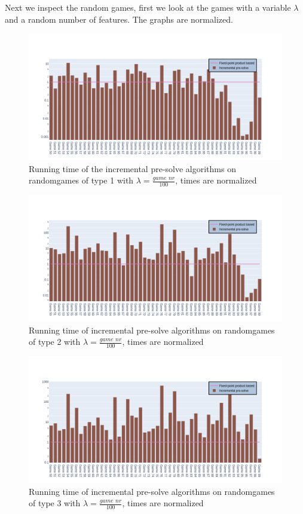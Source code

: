 Next we inspect the random games, first we look at the games with a variable $\lambda$ and a random number of features. The graphs are normalized.
\begin{figure}[H]
	\includegraphics[width=1\linewidth]{"results/FF_randomgames/Fixed-point product based_Incremental pre-solve_"}
	\caption{Running time of the incremental pre-solve algorithms on randomgames of type 1 with $\lambda = \frac{\textit{game nr}}{100}$, times are normalized}
	\label{fig:type1FPIteglobal}
\end{figure}%
\begin{figure}[H]
	\includegraphics[width=1\linewidth]{"results/FC_randomgames/Fixed-point product based_Incremental pre-solve_"}
	\caption{Running time of incremental pre-solve algorithms on randomgames of type 2 with $\lambda = \frac{\textit{game nr}}{100}$, times are normalized}
	\label{fig:elevatorzlnks}
\end{figure}%
\begin{figure}[H]
	\includegraphics[width=1\linewidth]{"results/BC_randomgames/Fixed-point product based_Incremental pre-solve_"}
	\caption{Running time of incremental pre-solve algorithms on randomgames of type 3 with $\lambda = \frac{\textit{game nr}}{100}$, times are normalized}
	\label{fig:elevatorzlnks}
\end{figure}%
